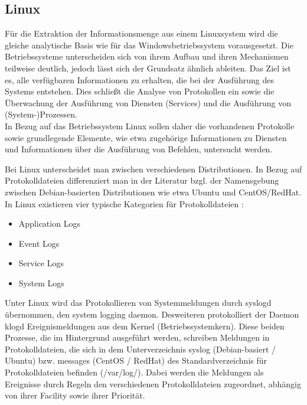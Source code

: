 \subsection{Linux}
Für die Extraktion der Informationsmenge aus einem Linuxsystem wird die gleiche analytische Basis wie für das Windowsbetriebssystem vorausgesetzt. Die Betriebssysteme unterscheiden sich von ihrem Aufbau und ihren Mechanismen teilweise deutlich, jedoch lässt sich der Grundsatz ähnlich ableiten. Das Ziel ist es, alle verfügbaren Informationen zu erhalten, die bei der Ausführung des Systems entstehen. Dies schließt die Analyse von Protokollen ein sowie die Überwachung der Ausführung von Diensten (Services) und die Ausführung von (System-)Prozessen. \\

In Bezug auf das Betriebssystem Linux sollen daher die vorhandenen Protokolle sowie grundlegende Elemente, wie etwa zugehörige Informationen zu Diensten und Informationen über die Ausführung von Befehlen, untersucht werden.

Bei Linux unterscheidet man zwischen verschiedenen Distributionen. In Bezug auf Protokolldateien differenziert man in der Literatur bzgl. der Namensgebung zwischen Debian-basierten Distributionen wie etwa Ubuntu und CentOS/RedHat. 
In Linux existieren vier typische Kategorien für Protokolldateien \citep{Linux1}:
\begin{itemize}
\item Application Logs
\item Event Logs
\item Service Logs
\item System Logs
\end{itemize}


Unter Linux wird das Protokollieren von Systemmeldungen durch \glqq syslogd\grqq{}  übernommen, den \glqq system logging daemon\grqq . Desweiteren protokolliert der Daemon \glqq klogd\grqq{} Ereignismeldungen aus dem Kernel (Betriebssystemkern). Diese beiden Prozesse, die im Hintergrund ausgeführt werden, schreiben Meldungen in Protokolldateien, die sich in dem Unterverzeichnis \glqq syslog\grqq{}  (Debian-basiert / Ubuntu) bzw. \glqq messages\grqq{}  (CentOS / RedHat) des Standardverzeichnis für Protokolldateien befinden (/var/log/). Dabei werden die Meldungen als Ereignisse durch Regeln den verschiedenen Protokolldateien zugeordnet, abhängig von ihrer \glqq Facility\grqq{}  sowie ihrer Priorität. 

